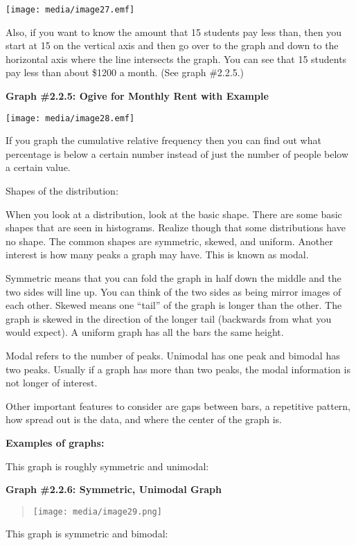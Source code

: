 \documentclass[]{book}
\begin{document}
\texttt{[image: media/image27.emf]}

Also, if you want to know the amount that 15 students pay less than,
then you start at 15 on the vertical axis and then go over to the graph
and down to the horizontal axis where the line intersects the graph. You
can see that 15 students pay less than about \$1200 a month. (See graph
\#2.2.5.)

\textbf{Graph \#2.2.5: Ogive for Monthly Rent with Example}

\texttt{[image: media/image28.emf]}

If you graph the cumulative relative frequency then you can find out
what percentage is below a certain number instead of just the number of
people below a certain value.

Shapes of the distribution:

When you look at a distribution, look at the basic shape. There are some
basic shapes that are seen in histograms. Realize though that some
distributions have no shape. The common shapes are symmetric, skewed,
and uniform. Another interest is how many peaks a graph may have. This
is known as modal.

Symmetric means that you can fold the graph in half down the middle and
the two sides will line up. You can think of the two sides as being
mirror images of each other. Skewed means one ``tail'' of the graph is
longer than the other. The graph is skewed in the direction of the
longer tail (backwards from what you would expect). A uniform graph has
all the bars the same height.

Modal refers to the number of peaks. Unimodal has one peak and bimodal
has two peaks. Usually if a graph has more than two peaks, the modal
information is not longer of interest.

Other important features to consider are gaps between bars, a repetitive
pattern, how spread out is the data, and where the center of the graph
is.

\textbf{Examples of graphs:}

This graph is roughly symmetric and unimodal:

\textbf{Graph \#2.2.6: Symmetric, Unimodal Graph}

\begin{quote}
\texttt{[image: media/image29.png]}
\end{quote}

This graph is symmetric and bimodal:
\end{document}
